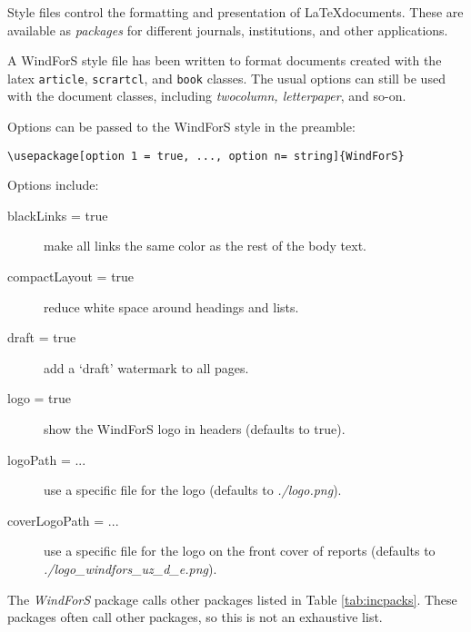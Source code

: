 Style files control the formatting and presentation of \LaTeX documents. These are available as \emph{packages} for different journals, institutions, and other applications. 

A WindForS style file has been written to format documents created with the latex \texttt{article}, \texttt{scrartcl}, and \texttt{book} classes. The usual options can still be used with the document classes, including \emph{twocolumn, letterpaper}, and so-on.

Options can be passed to the WindForS style in the preamble:

\begin{lstlisting}
\usepackage[option 1 = true, ..., option n= string]{WindForS}
\end{lstlisting}

Options include:
\begin{description}
\item[blackLinks = true]{make all links the same color as the rest of the body text.}
\item[compactLayout = true]{reduce white space around headings and lists.}
\item[draft = true]{add a `draft' watermark to all pages.}
\item[logo = true]{show the WindForS logo in headers (defaults to true).}
\item[logoPath = ...]{use a specific file for the logo (defaults to \emph{./logo.png}).}
\item[coverLogoPath = ...]{use a specific file for the logo on the front cover of reports (defaults to \emph{./logo\_windfors\_uz\_d\_e.png}).}
\end{description}

The \emph{WindForS} package calls other packages listed in Table \ref{tab:incpacks}. These packages often call other packages, so this is not an exhaustive list.

